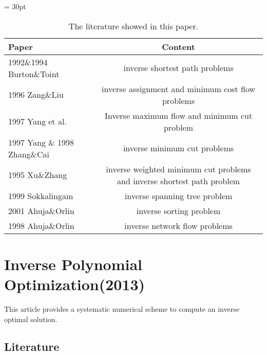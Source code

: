 \documentclass[UTF8]{article}
\begin{document}
\begin{table}[!h]
 
 \tabcolsep = 30pt
 
 \small\renewcommand{}
 
 \caption{The literature showed in this paper.\label{tab:4}}
 
 {\begin{tabular}{lc}
   \hline
   Paper                        & Content                                                                 \\
   \hline
   1992\&1994 Burton\&Toint     & inverse shortest path problems                                          \\
   \hline
   1996 Zang\&Liu               & inverse assignment and minimum cost flow problems                       \\
   \hline
   1997 Yang et al.             & Inverse maximum flow and minimum cut problem                            \\
   \hline
   1997 Yang \& 1998 Zhang\&Cai & inverse minimum cut problems                                            \\
   \hline
   1995 Xu\&Zhang               & inverse weighted minimum cut problems and inverse shortest path problem \\
   \hline
   1999 Sokkalingam             & inverse spanning tree problem                                           \\
   \hline
   2001 Ahuja\&Orlin            & inverse sorting problem                                                 \\
   \hline
   1998 Ahuja\&Orlin            & inverse network flow problems                                           \\
   \hline
  \end{tabular}}
 {}
\end{table}




\section{Inverse Polynomial Optimization(2013)}


This article provides a systematic numerical scheme to compute an inverse optimal solution.

\subsection{Literature}
\end{document}
